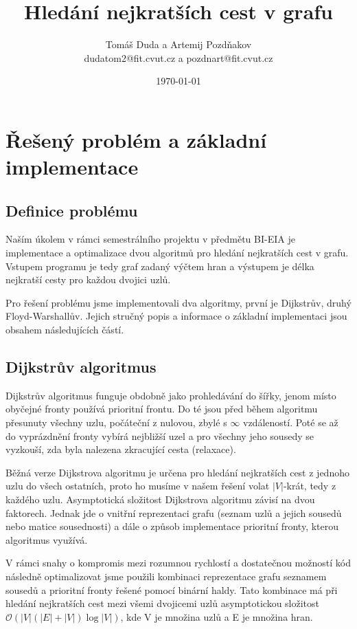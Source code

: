\documentclass[a4paper,11pt]{article}
\title{Hledání nejkratších cest v grafu}
\date{\today}
\author{Tomáš Duda a Artemij Pozdňakov \\ dudatom2@fit.cvut.cz a pozdnart@fit.cvut.cz}
\begin{document}
\maketitle
\newpage

\tableofcontents
\newpage

\section{Řešený problém a základní implementace}
\subsection{Definice problému}
Naším úkolem v rámci semestrálního projektu v předmětu BI-EIA je implementace a optimalizace dvou algoritmů pro hledání nejkratších cest v grafu. Vstupem programu je tedy graf zadaný výčtem hran a výstupem je délka nejkratší cesty pro každou dvojici uzlů.
\par
Pro řešení problému jsme implementovali dva algoritmy, první je Dijk\-strův, druhý Floyd-Warshallův. Jejich stručný popis a informace o základní implementaci jsou obsahem ná\-sle\-dujících částí.

\subsection{Dijkstrův algoritmus}
Dijkstrův algoritmus funguje obdobně jako prohledávání do šířky, jenom místo obyčejné fronty používá prioritní frontu. Do té jsou před během algoritmu přesunuty všechny uzlu, počáteční z nulovou, zbylé s $\infty$ vzdáleností. Poté se až do vyprázdnění fronty vybírá nejbližší uzel a pro všechny jeho sousedy se vyzkouší, zda byla nalezena zkracující cesta (relaxace). 
\par
Běžná verze Dijkstrova algoritmu je určena pro hledání nejkratších cest z jednoho uzlu do všech ostatních, proto ho musíme v našem řešení volat $|V|$-krát, tedy z každého uzlu. Asymptotická složitost Dijkstrova algoritmu závisí na dvou faktorech. Jednak jde o vnitřní reprezentaci grafu (seznam uzlů a jejich sousedů nebo matice sousednosti) a dále o způsob implementace prioritní fronty, kterou algoritmus využívá.
\par
V rámci snahy o kompromis mezi rozumnou rychlostí a dostatečnou možností kód následně optimalizovat jsme použili kombinaci reprezentace grafu seznamem sousedů a prioritní fronty řešené pomocí binární haldy. Tato kombinace má při hledání nejkratších cest mezi všemi dvojicemi uzlů asymptotickou složitost $\mathcal{O}(|V|(|E|+|V|)\log{|V|})$, kde V je množina uzlů a E je množina hran.
\end{document}
